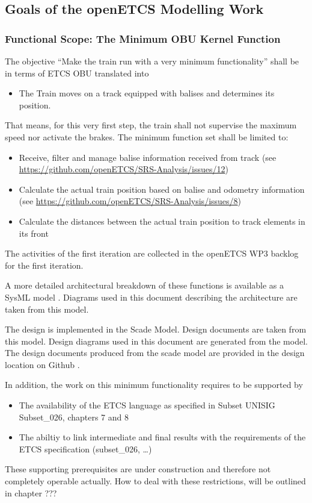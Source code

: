 \documentclass{template/openetcs_article}
\begin{document}
\subsection{Goals of the openETCS Modelling Work}


\subsubsection{Functional Scope: The Minimum OBU Kernel Function}
\label{sec:FunctionalScopeTheMinimumOBUKernelFunction}

The objective ``Make the train run with a very minimum functionality'' shall be in terms of ETCS OBU translated into 
\begin{itemize}
	\item The Train moves on a track equipped with balises and determines its position.
\end{itemize}
That means, for this very first step, the train shall not supervise the maximum speed nor activate the brakes. The minimum function set shall be limited to:
\begin{itemize}
	\item Receive, filter and manage balise information received from track (see \url{https://github.com/openETCS/SRS-Analysis/issues/12})
	\item Calculate the actual train position based on balise and odometry information (see \url{https://github.com/openETCS/SRS-Analysis/issues/8})
	\item Calculate the distances between the actual train position to track elements in its front
\end{itemize}
The activities of the first iteration are collected in the \cite{firstIteration} openETCS WP3 backlog for the first iteration.

A more detailed architectural breakdown of these functions is available as a SysML model \cite{sysml-model}. Diagrams used in this document describing the architecture are taken from this model.

The design is implemented in the \cite{scade-model} Scade Model. Design documents are taken from this model. Design diagrams used in this document are generated from the model. The design documents produced from the scade model are provided in the design location on Github \cite{designFI}.

In addition, the work on this minimum functionality requires to be supported by
\begin{itemize}
	\item The availability of the ETCS language as specified in Subset UNISIG Subset\_026, chapters 7 and 8
	\item The abiltiy to link intermediate and final results with the requirements of the ETCS specification (subset\_026, \dots) 
\end{itemize}
These supporting prerequisites are under construction and therefore not completely operable actually. How to deal with these restrictions, will be outlined in chapter ???
\end{document}
